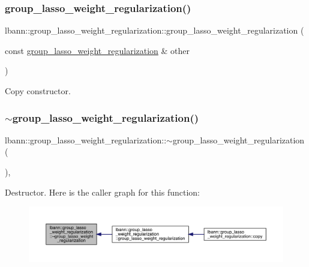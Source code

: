 \subsubsection{\texorpdfstring{group\+\_\+lasso\+\_\+weight\+\_\+regularization()}{group\_lasso\_weight\_regularization()}\hspace{0.1cm}{\footnotesize\ttfamily [2/2]}}
{\footnotesize\ttfamily lbann\+::group\+\_\+lasso\+\_\+weight\+\_\+regularization\+::group\+\_\+lasso\+\_\+weight\+\_\+regularization (\begin{DoxyParamCaption}\item[{const \hyperlink{classlbann_1_1group__lasso__weight__regularization}{group\+\_\+lasso\+\_\+weight\+\_\+regularization} \&}]{other }\end{DoxyParamCaption})\hspace{0.3cm}{\ttfamily [default]}}

Copy constructor. \mbox{\label{classlbann_1_1group__lasso__weight__regularization_a8a7a5cc007c3fae62a95d500cee239ce}} 
\subsubsection{\texorpdfstring{$\sim$group\+\_\+lasso\+\_\+weight\+\_\+regularization()}{~group\_lasso\_weight\_regularization()}}
{\footnotesize\ttfamily lbann\+::group\+\_\+lasso\+\_\+weight\+\_\+regularization\+::$\sim$group\+\_\+lasso\+\_\+weight\+\_\+regularization (\begin{DoxyParamCaption}{ }\end{DoxyParamCaption})\hspace{0.3cm}{\ttfamily [override]}, {\ttfamily [default]}}

Destructor. Here is the caller graph for this function\+:\nopagebreak
\begin{figure}[H]
\begin{center}
\leavevmode
\includegraphics[width=350pt]{classlbann_1_1group__lasso__weight__regularization_a8a7a5cc007c3fae62a95d500cee239ce_icgraph}
\end{center}
\end{figure}


